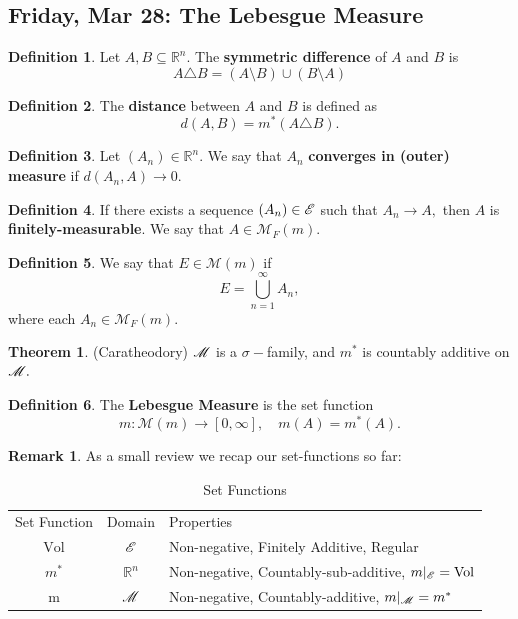 \documentclass[10pt, oneside]{article}
\newcommand{\bbR}{\mathbb{R}}
\newcommand{\Vol}{\text{Vol}}
\newcommand{\sm}{\setminus}
\theoremstyle{definition}
\newtheorem{thm}{Theorem}
\newtheorem{defn}{Definition}
\newtheorem{rem}{Remark}
\begin{document}
\subsection{Friday, Mar 28: The Lebesgue Measure}
\begin{defn}
    Let $A, B \subseteq \bbR^n.$ The \textbf{symmetric difference} of $A$ and $B$ is 
    \[A\triangle B = (A\sm B) \cup (B\sm A)\]
\end{defn}
\begin{defn}
    The \textbf{distance} between $A$ and $B$ is defined as
    \[d(A,B) = m^*(A\triangle B).\]
\end{defn}
\begin{defn}
    Let $(A_n) \in \bbR^n.$ We say that $A_n$  \textbf{converges in (outer) measure} if $d(A_n, A) \to 0.$
\end{defn}
\begin{defn}
    If there exists a sequence $(A_n) \in \cal E$ such that $A_n \to A,$ then $A$ is \textbf{finitely-measurable}. We say that $A \in \mathcal{M}_F(m).$
\end{defn}
\begin{defn}
    We say that $E \in \mathcal{M}(m)$ if 
    \[E = \bigcup_{n=1}^\infty A_n,\] where each $A_n \in \mathcal{M}_F(m).$
\end{defn}
\begin{thm}
    (Caratheodory) $\cal M$ is a $\sigma-$family, and $m^*$ is countably additive on $\cal M.$
\end{thm}
\begin{defn}
    The \textbf{Lebesgue Measure} is the set function 
    \[m: \mathcal{M}(m) \to [0, \infty], \quad m(A) = m^*(A).\]
\end{defn}
\begin{rem}
    As a small review we recap our set-functions so far:
    \begin{table}[H]
        \centering
        \begin{tabular}{c|cl}
             Set Function&   Domain&Properties\\
             $\Vol$& 
         $\cal E$&Non-negative, Finitely Additive, Regular\\
 $m^*$& $\bbR^n$&Non-negative, Countably-sub-additive, $m|_{\cal E} = \Vol$\\
 m& $\cal M$&Non-negative, Countably-additive, $m|_{\cal M} = m^*$\\\end{tabular}
        \caption{Set Functions}

    \end{table}
\end{rem}
\end{document}
